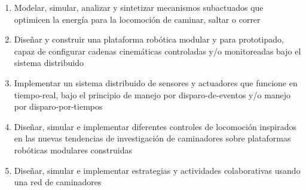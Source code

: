 \begin{frame}[plain,t,label=exp_capas]
{    \parbox[c]{12cm}{
      \begin{enumerate}[\textbf{OE:} 1.]\scriptsize
      \item Modelar, simular, analizar y sintetizar mecanismos subactuados que optimicen la energ\'ia para la locomoci\'on de caminar, saltar o correr
      \item Dise\~nar y construir una plataforma rob\'otica modular y para prototipado, capaz de configurar cadenas cinem\'aticas  controladas y/o monitoreadas bajo el sistema distribuido
      \item Implementar un sistema distribuido de sensores y actuadores que funcione en tiempo-real, bajo el principio de manejo por disparo-de-eventos y/o manejo por disparo-por-tiempos
      \item Dise\~nar, simular e implementar diferentes controles de locomoci\'on inspirados en las nuevas tendencias de investigaci\'on de caminadores sobre plataformas rob\'oticas modulares construidas
      \item Dise\~nar, simular e implementar estrategias y actividades colaborativas usando una red de caminadores
      \end{enumerate}
    }
  }
  \hyperlink{def_objesp}{}
\end{frame}